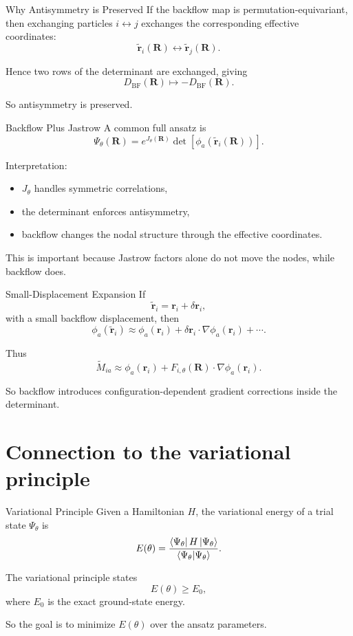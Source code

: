 \documentclass[aspectratio=169]{beamer}
\begin{document}
\begin{frame}{Why Antisymmetry is Preserved}
If the backflow map is permutation-equivariant, then exchanging particles \(i\leftrightarrow j\) exchanges the corresponding effective coordinates:
\[
\tilde{\mathbf{r}}_i(\mathbf{R}) \leftrightarrow \tilde{\mathbf{r}}_j(\mathbf{R}).
\]

Hence two rows of the determinant are exchanged, giving
\[
D_{\mathrm{BF}}(\mathbf{R})\mapsto -D_{\mathrm{BF}}(\mathbf{R}).
\]

So antisymmetry is preserved.
\end{frame}

\begin{frame}{Backflow Plus Jastrow}
A common full ansatz is
\[
\Psi_\theta(\mathbf{R})
=
e^{J_\theta(\mathbf{R})}
\det[\phi_a(\tilde{\mathbf{r}}_i(\mathbf{R}))].
\]

Interpretation:
\begin{itemize}
    \item \(J_\theta\) handles symmetric correlations,
    \item the determinant enforces antisymmetry,
    \item backflow changes the nodal structure through the effective coordinates.
\end{itemize}

This is important because Jastrow factors alone do not move the nodes, while backflow does.
\end{frame}

\begin{frame}{Small-Displacement Expansion}
If
\[
\tilde{\mathbf{r}}_i=\mathbf{r}_i+\delta \mathbf{r}_i,
\]
with a small backflow displacement, then
\[
\phi_a(\tilde{\mathbf{r}}_i)
\approx
\phi_a(\mathbf{r}_i)
+
\delta \mathbf{r}_i \cdot \nabla \phi_a(\mathbf{r}_i)
+\cdots.
\]

Thus
\[
\widetilde{M}_{ia}
\approx
\phi_a(\mathbf{r}_i)
+
F_{i,\theta}(\mathbf{R})\cdot \nabla\phi_a(\mathbf{r}_i).
\]

So backflow introduces configuration-dependent gradient corrections inside the determinant.
\end{frame}

\section{Connection to the variational principle}

\begin{frame}{Variational Principle}
Given a Hamiltonian \(H\), the variational energy of a trial state \(\Psi_\theta\) is
\[
E(\theta)
=
\frac{\bra{\Psi_\theta}H\ket{\Psi_\theta}}{\braket{\Psi_\theta|\Psi_\theta}}.
\]

The variational principle states
\[
E(\theta)\ge E_0,
\]
where \(E_0\) is the exact ground-state energy.

So the goal is to minimize \(E(\theta)\) over the ansatz parameters.
\end{frame}
\end{document}
